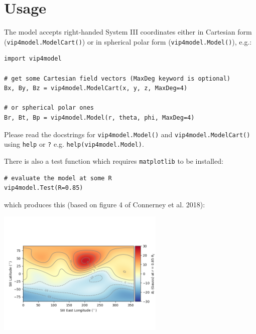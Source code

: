 \section{Usage}

The model accepts right-handed System III coordinates either in Cartesian form (\texttt{vip4model.ModelCart()}) or in spherical polar form (\texttt{vip4model.Model()}), e.g.:

\begin{verbatim}
import vip4model

# get some Cartesian field vectors (MaxDeg keyword is optional)
Bx, By, Bz = vip4model.ModelCart(x, y, z, MaxDeg=4)

# or spherical polar ones
Br, Bt, Bp = vip4model.Model(r, theta, phi, MaxDeg=4)
\end{verbatim}

Please read the docstrings for \texttt{vip4model.Model()} and \texttt{vip4model.ModelCart()} using \texttt{help} or \texttt{?} e.g. \texttt{help(vip4model.Model)}.

There is also a test function which requires \texttt{matplotlib} to be installed:

\begin{verbatim}
# evaluate the model at some R
vip4model.Test(R=0.85)
\end{verbatim}

which produces this (based on figure 4 of Connerney et al. 2018):

\begin{center}
\includegraphics[width=0.6\textwidth]{figures/ch3_vip4test.png}
\end{center}